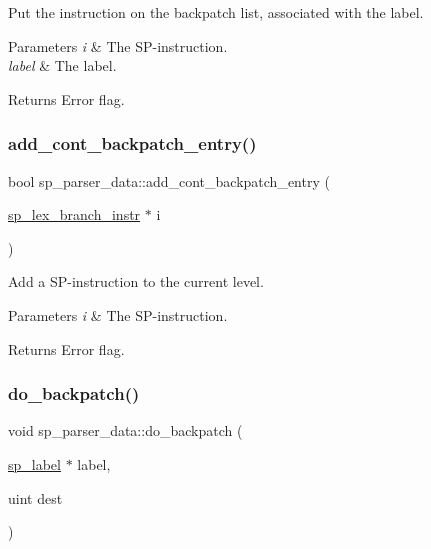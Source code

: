 Put the instruction on the backpatch list, associated with the label.


\begin{DoxyParams}{Parameters}
{\em i} & The SP-\/instruction. \\
\hline
{\em label} & The label.\\
\hline
\end{DoxyParams}
\begin{DoxyReturn}{Returns}
Error flag. 
\end{DoxyReturn}
\mbox{\label{classsp__parser__data_abfbd10313fd6eb4fc52276afd8e9dc24}} 
\subsubsection{\texorpdfstring{add\+\_\+cont\+\_\+backpatch\+\_\+entry()}{add\_cont\_backpatch\_entry()}}
{\footnotesize\ttfamily bool sp\+\_\+parser\+\_\+data\+::add\+\_\+cont\+\_\+backpatch\+\_\+entry (\begin{DoxyParamCaption}\item[{\mbox{\hyperlink{classsp__lex__branch__instr}{sp\+\_\+lex\+\_\+branch\+\_\+instr}} $\ast$}]{i }\end{DoxyParamCaption})}

Add a SP-\/instruction to the current level.


\begin{DoxyParams}{Parameters}
{\em i} & The SP-\/instruction.\\
\hline
\end{DoxyParams}
\begin{DoxyReturn}{Returns}
Error flag. 
\end{DoxyReturn}
\mbox{\label{classsp__parser__data_afef12cbb1f7562091238e01a492f9201}} 
\subsubsection{\texorpdfstring{do\+\_\+backpatch()}{do\_backpatch()}}
{\footnotesize\ttfamily void sp\+\_\+parser\+\_\+data\+::do\+\_\+backpatch (\begin{DoxyParamCaption}\item[{\mbox{\hyperlink{classsp__label}{sp\+\_\+label}} $\ast$}]{label,  }\item[{uint}]{dest }\end{DoxyParamCaption})}

